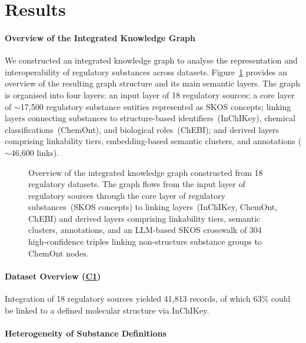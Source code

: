 \section{Results}
\label{sec:results}

\paragraph{Overview of the Integrated Knowledge Graph}
\label{sec:knowledge_graph}

We constructed an integrated knowledge graph to analyse the representation and interoperability of regulatory substances across datasets.
Figure~\ref{fig:knowledge_graph} provides an overview of the resulting graph structure and its main semantic layers.
The graph is organised into four layers: an input layer of 18 regulatory sources; a core layer of $\sim$17,500 regulatory substance entities represented as SKOS concepts; linking layers connecting substances to structure-based identifiers~(InChIKey), chemical classifications~(ChemOnt), and biological roles~(ChEBI); and derived layers comprising linkability tiers, embedding-based semantic clusters, and annotations ($\sim$46,600 links).

\begin{figure}[!ht]
    \centering
    \caption{
        Overview of the integrated knowledge graph constructed from 18 regulatory datasets.
        The graph flows from the input layer of regulatory sources through the core layer of regulatory substances~(SKOS concepts) to linking layers~(InChIKey, ChemOnt, ChEBI) and derived layers comprising linkability tiers, semantic clusters, annotations, and an LLM-based SKOS crosswalk of 304 high-confidence triples linking non-structure substance groups to ChemOnt nodes.
    }\label{fig:knowledge_graph}
\end{figure}

\paragraph{Dataset Overview (\texorpdfstring{\hyperref[sec:contribution1]{C1}}{C1})}

Integration of 18 regulatory sources yielded 41,813 records, of which 63\% could be linked to a defined molecular structure via InChIKey.

\paragraph{Heterogeneity of Substance Definitions}
\label{sec:semantic_mismatch}

